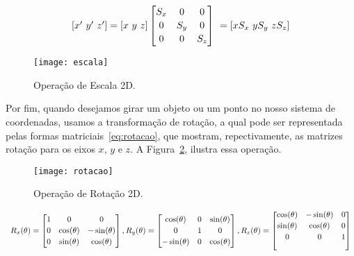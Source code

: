 \begin{equation}\label{eq:escala}
    \begin{array}{c c c}
    [x' \ y' \ z'] = [x \ y \ z]
    \begin{bmatrix}
     S_x & 0 & 0   \\[0.2em]
     0 & S_y & 0   \\[0.2em]
     0 & 0 & S_z
    \end{bmatrix}
    \
    = [xS_x\ yS_y\ zS_z]
    \end{array}
\end{equation}

\begin{figure}[ht!]
      \centering
	  \texttt{[image: escala]}
	  \caption{Operação de Escala 2D.}
	  \label{fg:escala}
\end{figure} 

Por fim, quando desejamos girar um objeto ou um ponto no nosso sistema de coordenadas, usamos a transformação de rotação, a qual pode ser representada pelas formas matriciais~\ref{eq:rotacao}, que mostram, repectivamente, as matrizes rotação para os eixos $x$, $y$ e $z$. A Figura~\ref{fg:rotacao}, ilustra essa operação.

\begin{figure}[ht!]
      \centering
	  \texttt{[image: rotacao]}
	  \caption{Operação de Rotação 2D.}
	  \label{fg:rotacao}
\end{figure} 
\begin{center}
\begin{equation}\label{eq:rotacao}
  \begin{array}{c c c}
     R_x(\theta) = \begin{bmatrix}
    1 & 0 & 0   \\[0.2em]
    0 & \cos(\theta) & -\sin(\theta)    \\[0.2em]
    0 & \sin(\theta) & \cos(\theta) \\
    \end{bmatrix}
    , 
    R_y(\theta) = \begin{bmatrix}
    \cos(\theta) & 0 & \sin(\theta) \\[0.2em]
    0 & 1 & 0   \\[0.2em]
    -\sin(\theta) & 0 & \cos(\theta)\\
    \end{bmatrix}
    ,
    R_z(\theta) = \begin{bmatrix}
    \cos(\theta) & -\sin(\theta) & 0\\[0.2em]
    \sin(\theta) & \cos(\theta) & 0\\[0.2em]
    0 & 0 & 1\\\ 
    \end{bmatrix}
    \end{array}
\end{equation}
\end{center}

